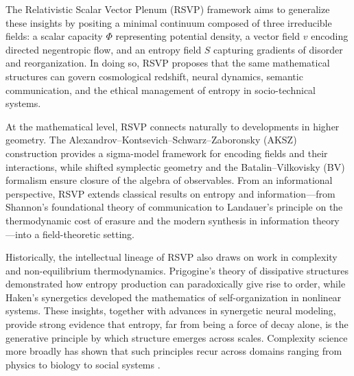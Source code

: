 \documentclass[12pt]{article}
\begin{document}
The Relativistic Scalar Vector Plenum (RSVP) framework aims to generalize these insights by positing a minimal continuum composed of three irreducible fields: a scalar capacity $\Phi$ representing potential density, a vector field $v$ encoding directed negentropic flow, and an entropy field $S$ capturing gradients of disorder and reorganization. In doing so, RSVP proposes that the same mathematical structures can govern cosmological redshift, neural dynamics, semantic communication, and the ethical management of entropy in socio-technical systems.  

At the mathematical level, RSVP connects naturally to developments in higher geometry. The Alexandrov–Kontsevich–Schwarz–Zaboronsky (AKSZ) construction \cite{Alexandrov:1995kv} provides a sigma-model framework for encoding fields and their interactions, while shifted symplectic geometry \cite{Pantev:2011ns} and the Batalin–Vilkovisky (BV) formalism \cite{BatalinVilkovisky1981} ensure closure of the algebra of observables. From an informational perspective, RSVP extends classical results on entropy and information---from Shannon’s foundational theory of communication \cite{Shannon1948} to Landauer’s principle on the thermodynamic cost of erasure \cite{Landauer1961,Bennett1982} and the modern synthesis in information theory \cite{CoverThomas2006}---into a field-theoretic setting.  

Historically, the intellectual lineage of RSVP also draws on work in complexity and non-equilibrium thermodynamics. Prigogine’s theory of dissipative structures \cite{Prigogine1980} demonstrated how entropy production can paradoxically give rise to order, while Haken’s synergetics \cite{Haken1983} developed the mathematics of self-organization in nonlinear systems. These insights, together with advances in synergetic neural modeling, provide strong evidence that entropy, far from being a force of decay alone, is the generative principle by which structure emerges across scales. Complexity science more broadly has shown that such principles recur across domains ranging from physics to biology to social systems \cite{Smolin2019,Levin2022}.  
\end{document}
